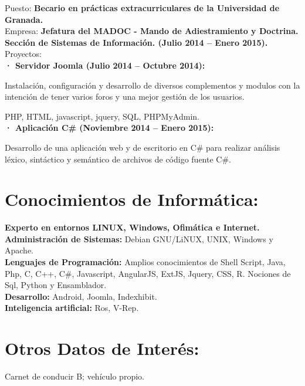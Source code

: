 \documentclass	[10pt,a4paper,oneside]{article}
\newcommand{\seccion}[1]{\vspace*{3mm}\section*{#1}\vspace*{-3mm}}
\begin{document}
\newpage
Puesto: \textbf{Becario en prácticas extracurriculares de la Universidad de Granada.}\\
Empresa: \textbf{Jefatura del MADOC - Mando de Adiestramiento y Doctrina. Sección de Sistemas de Información. (Julio 2014 – Enero 2015).}\\
Proyectos:\\
\hspace*{1cm}\textbf{· Servidor Joomla (Julio 2014 – Octubre 2014):}\par
{\addtolength{\leftskip}{2cm}Instalación, configuraci\'on y desarrollo de diversos complementos y modulos con la intención de tener varios foros y una mejor gestión de los usuarios.\par}
\hspace*{2cm}PHP, HTML, javascript, jquery, SQL, PHPMyAdmin.\\
\hspace*{1cm}\textbf{· Aplicación C\# (Noviembre 2014 – Enero 2015):}\par
{\addtolength{\leftskip}{2cm}
Desarrollo de una aplicación web y de escritorio en C\# para realizar análisis léxico, sintáctico y semántico de archivos de código fuente C\#.\par}


\seccion{Conocimientos de Informática:}
\textbf{Experto en entornos LINUX, Windows, Ofimática e Internet.}\\
\textbf{Administración de Sistemas:} Debian GNU/LiNUX, UNIX, Windows y Apache.\\
\textbf{Lenguajes de Programación:} Amplios conocimientos de Shell Script, Java, Php, C,
C++, C\#, Javascript, AngularJS, ExtJS, Jquery, CSS, R. Nociones de Sql, Python y Ensamblador.\\
\textbf{Desarrollo:} Android, Joomla, Indexhibit.\\
\textbf{Inteligencia artificial:} Ros, V-Rep.


\seccion{Otros Datos de Interés:}
Carnet de conducir B; vehículo propio.\\
\end{document}
